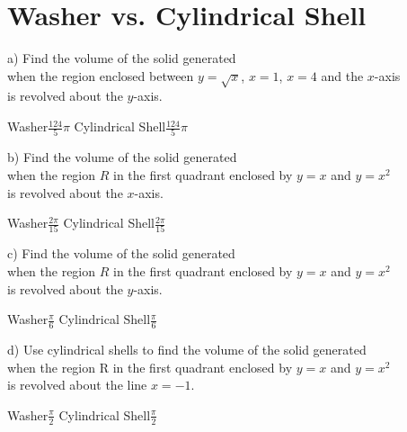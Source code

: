 
\section{Washer vs. Cylindrical Shell}

\noindent a) Find the volume of the solid generated \\
when the region enclosed between $y=\sqrt{x}$, $x=1$, $x=4$ and the $x$-axis \\
is revolved about the $y$-axis. 

\pairofprobsans%
{Washer}{$\displaystyle \frac{124}{5} \pi$}%
{Cylindrical Shell}{$\displaystyle \frac{124}{5} \pi$}%


\makenewpage
\noindent b) Find the volume of the solid generated \\
when the region $R$ in the first quadrant enclosed by $y=x$ and $y=x^2$ \\
is revolved about the $x$-axis. 

\pairofprobsans%
{Washer}{$\displaystyle \frac{2\pi}{15}$}%
{Cylindrical Shell}{$\displaystyle \frac{2\pi}{15}$}%

\noindent c) Find the volume of the solid generated \\
when the region $R$ in the first quadrant enclosed by $y=x$ and $y=x^2$ \\
is revolved about the $y$-axis. 

\pairofprobsans%
{Washer}{$\displaystyle \frac{\pi}{6}$}%
{Cylindrical Shell}{$\displaystyle \frac{\pi}{6}$}%

\makenewpage
\noindent d) Use cylindrical shells to find the volume of the solid generated \\
when the region R in the first quadrant enclosed by $y=x$ and $y=x^2$ \\
is revolved about the line $x=-1$. 

\pairofprobsans%
{Washer}{$\displaystyle \frac{\pi}{2}$}%
{Cylindrical Shell}{$\displaystyle \frac{\pi}{2}$}%

